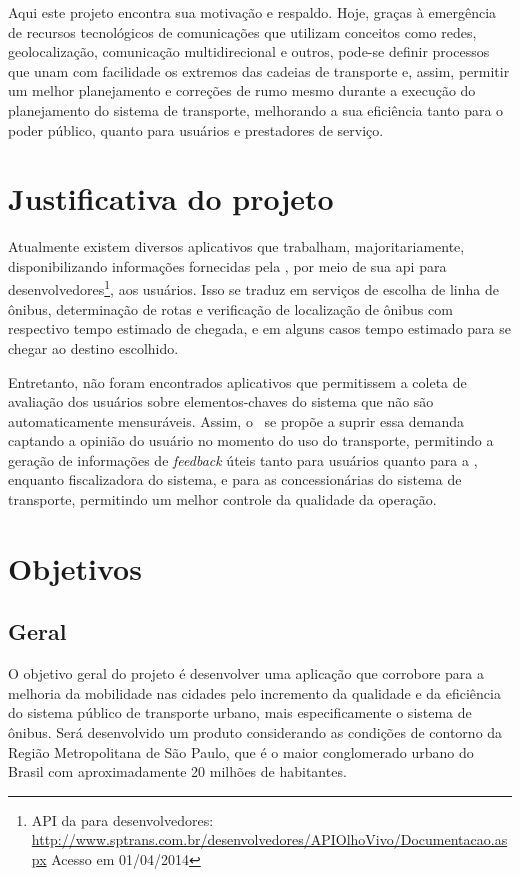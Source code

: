 Aqui este projeto encontra sua motivação e respaldo. Hoje, graças à emergência de recursos tecnológicos de comunicações que utilizam conceitos como redes, geolocalização, comunicação multidirecional e outros, pode-se definir processos que unam com facilidade os extremos das cadeias de transporte e, assim, permitir um melhor planejamento e correções de rumo mesmo durante a execução do planejamento do sistema de transporte, melhorando a sua eficiência tanto para o poder público, quanto para usuários e prestadores de serviço.

\section{Justificativa do projeto}\label{sec:justificativa}
Atualmente existem diversos aplicativos que trabalham, majoritariamente, disponibilizando informações fornecidas pela \sptrans, por meio de sua \gls{api} para desenvolvedores\footnote{API da \sptrans para desenvolvedores: \url{http://www.sptrans.com.br/desenvolvedores/APIOlhoVivo/Documentacao.aspx} Acesso em 01/04/2014}, aos usuários. 
Isso se traduz em serviços de escolha de linha de ônibus, determinação de rotas e verificação de localização de ônibus com respectivo tempo estimado de chegada, e em alguns casos tempo estimado para se chegar ao destino escolhido.

Entretanto, não foram encontrados aplicativos que permitissem a coleta de avaliação dos usuários sobre elementos-chaves do sistema que não são automaticamente mensuráveis. Assim, o \trilhasp~se propõe a suprir essa demanda captando a opinião do usuário no momento do uso do transporte, permitindo a geração de informações de \textit{feedback} úteis tanto para usuários quanto para a \sptrans, enquanto fiscalizadora do sistema, e para as concessionárias do sistema de transporte, permitindo um melhor controle da qualidade da operação.

\section{Objetivos}\label{sec:objetivos}
\subsection{Geral}\label{subsec:objGerais}
O objetivo geral do projeto é desenvolver uma aplicação que corrobore para a melhoria da mobilidade nas cidades pelo incremento da qualidade e da eficiência do sistema público de transporte urbano, mais especificamente o sistema de ônibus. Será desenvolvido um produto considerando as condições de contorno da Região Metropolitana de São Paulo, que é o maior conglomerado urbano do Brasil com aproximadamente 20 milhões de habitantes.

